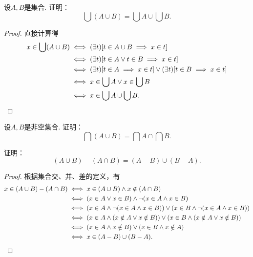 \begin{example}
设\(A,B\)是集合.
证明：\begin{equation}\label{equation:集合论.并集的并等于并的并集}
	\bigcup(A \cup B) = \bigcup A \cup \bigcup B.
\end{equation}
\begin{proof}
直接计算得
\begin{align*}
	x \in \bigcup(A \cup B)
	&\iff
	(\exists t)[t \in A \cup B \implies x \in t] \\
	&\iff
	(\exists t)[t \in A \lor t \in B \implies x \in t] \\
	&\iff
	(\exists t)[t \in A \implies x \in t] \lor (\exists t)[t \in B \implies x \in t] \\
	&\iff
	x \in \bigcup A \lor x \in \bigcup B \\
	&\iff
	x \in \bigcup A \cup \bigcup B.
	\qedhere
\end{align*}
\end{proof}
\end{example}

\begin{example}
设\(A,B\)是非空集合.
证明：\begin{equation}
	\bigcap(A \cup B) = \bigcap A \cap \bigcap B.
\end{equation}
\end{example}

\begin{example}
证明：\begin{equation}
	(A \cup B) - (A \cap B) = (A-B)\cup(B-A).
\end{equation}
\begin{proof}
根据集合交、并、差的定义，有
\begin{align*}
	x \in (A \cup B) - (A \cap B)
	&\iff x \in (A \cup B) \land x \notin (A \cap B) \\
	&\iff (x \in A \lor x \in B) \land \neg(x \in A \land x \in B) \\
	&\iff (x \in A \land \neg(x \in A \land x \in B))
	 \lor (x \in B \land \neg(x \in A \land x \in B)) \\
	&\iff (x \in A \land (x \notin A \lor x \notin B))
	 \lor (x \in B \land (x \notin A \lor x \notin B)) \\
	&\iff (x \in A \land x \notin B) \lor (x \in B \land x \notin A) \\
	&\iff x \in (A-B)\cup(B-A).
\qedhere
\end{align*}
\end{proof}
\end{example}
